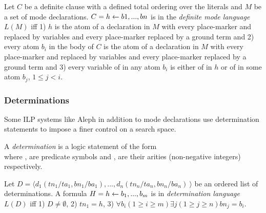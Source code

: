 \begin{defn}\label{definition_definite_mode_language}\cite{muggleton1995inverse}
Let $C$ be a definite clause with a
defined total ordering over the literals and $M$ be a set of mode declarations.
$C = h \leftarrow b1, ..., bn$ is in the \emph{definite mode language} $L(M)$ iff 1) $h$ is the atom
of a  declaration in $M$ with every place-marker  and  replaced by
variables and every place-marker  replaced by a ground term and 2) every
atom $b_i$ in the body of $C$ is the atom of a  declaration in $M$ with every
place-marker  and  replaced by variables and every place-marker 
replaced by a ground term and 3) every variable of  in any atom $b_i$ is either
of  in $h$ or of  in some atom $b_j$, $1 \le j < i$.
\end{defn}

\subsubsection{Determinations}
Some ILP systems like Aleph in addition to mode declarations use determination statements\cite{aleph2007} to impose a finer control on a search space.

\begin{defn}\cite{aleph2007}
A \emph{determination} is a logic statement of the form\\
where ,  are predicate symbols and
,  are their arities (non-negative integers) respectively.
\end{defn}

\begin{defn}\label{definition_determination_language}
Let $D=\langle d_1(tn_1/ta_1, bn_1/ba_1), ..., d_n(tn_n/ta_n, bn_n/ba_n)\ \rangle$ be an ordered list of determinations. A formula $H=h \leftarrow b_1, ..., b_m$ is in \emph{determination language} $L(D)$ iff
1) $D \not=\emptyset$, 2) $tn_1=h$, 3) $\forall b_i (1 \ge i \ge m) \exists j (1 \ge j \ge n) bn_j=b_i$.
\end{defn}

